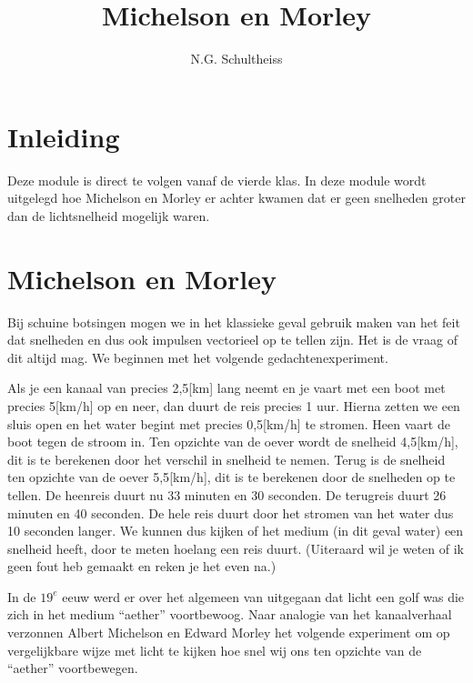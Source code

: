 



\title{Michelson en Morley}
\author{N.G. Schultheiss}
\date{}

\maketitle
\thispagestyle{firststyle}

\section{Inleiding}

Deze module is direct te volgen vanaf de vierde klas. In deze module
wordt uitgelegd hoe Michelson en Morley er achter kwamen dat er geen
snelheden groter dan de lichtsnelheid mogelijk waren.


\section{Michelson en Morley}

Bij schuine botsingen mogen we in het klassieke geval gebruik maken
van het feit dat snelheden en dus ook impulsen vectorieel op te tellen
zijn. Het is de vraag of dit altijd mag. We beginnen met het volgende
gedachten\-experiment.

Als je een kanaal van precies 2,5{[}km{]} lang neemt en je vaart met
een boot met precies 5{[}km/h{]} op en neer, dan duurt de reis precies
1 uur. Hierna zetten we een sluis open en het water begint met precies
0,5{[}km/h{]} te stromen. Heen vaart de boot tegen de stroom in. Ten
opzichte van de oever wordt de snelheid 4,5{[}km/h{]}, dit is te berekenen
door het verschil in snelheid te nemen. Terug is de snelheid ten opzichte
van de oever 5,5{[}km/h{]}, dit is te berekenen door de snelheden
op te tellen. De heenreis duurt nu 33 minuten en 30 seconden. De terugreis
duurt 26 minuten en 40 seconden. De hele reis duurt door het stromen
van het water dus 10 seconden langer. We kunnen dus kijken of het
medium (in dit geval water) een snelheid heeft, door te meten hoelang
een reis duurt. (Uiteraard wil je weten of ik geen fout heb gemaakt
en reken je het even na.)

In de $19^{e}$ eeuw werd er over het algemeen van uitgegaan dat licht
een golf was die zich in het medium ``aether'' voortbewoog. Naar
analogie van het kanaalverhaal verzonnen Albert Michelson en Edward
Morley het volgende experiment om op verge\-lijk\-bare wijze met
licht te kijken hoe snel wij ons ten opzichte van de ``aether''
voortbewegen. 


